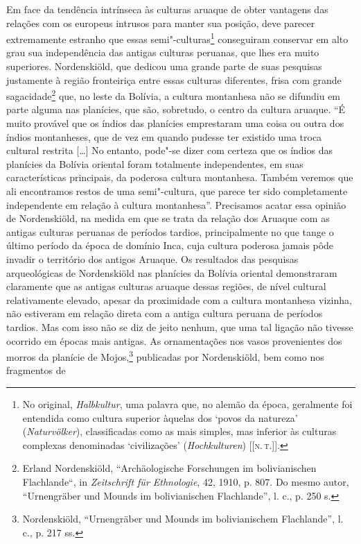 Em face da tendência intrínseca às culturas aruaque de obter vantagens
das relações com os europeus intrusos para manter sua posição, deve
parecer extremamente estranho que essas semi"-culturas\footnote{No original,
  \emph{Halbkultur}, uma palavra que, no alemão da época, geralmente
  foi entendida como cultura superior àquelas dos `povos da natureza'
  (\emph{Naturvölker}), classificadas como as mais simples, mas inferior
  às culturas complexas denominadas `civilizações' (\emph{Hochkulturen})
  {[}{[}\textsc{n.\,t.}{]}{]}.} conseguiram
conservar em alto grau sua independência das antigas culturas peruanas,
que lhes era muito superiores. Nordenskiöld, que dedicou uma grande
parte de suas pesquisas justamente à região fronteiriça entre essas
culturas diferentes, frisa com grande sagacidade\footnote{Erland Nordenskiöld, ``Archäologische Forschungen im bolivianischen
  Flachlande``, in \emph{Zeitschrift für Ethnologie}, 42, 1910, p. 807.
  Do mesmo autor, ``Urnengräber und Mounds im bolivianischen
  Flachlande'', l. c., p. 250 s.} que, no leste da Bolívia, a cultura
montanhesa não se difundiu em parte alguma nas planícies, que são,
sobretudo, o centro da cultura aruaque. ``É muito provável que os índios
das planícies emprestaram uma coisa ou outra dos índios montanheses,
que de vez em quando pudesse ter existido uma troca cultural restrita
{[}\ldots{}{]} No entanto, pode"-se dizer com certeza que os índios das
planícies da Bolívia oriental foram totalmente independentes, em suas
características principais, da poderosa cultura montanhesa. Também
veremos que ali encontramos restos de uma semi"-cultura, que parece ter
sido completamente independente em relação à cultura montanhesa''.
Precisamos acatar essa opinião de Nordenskiöld, na medida em que se
trata da relação dos Aruaque com as antigas culturas peruanas de
períodos tardios, principalmente no que tange o último período da época
de domínio Inca, cuja cultura poderosa jamais pôde invadir o território
dos antigos Aruaque. Os resultados das pesquisas arqueológicas de
Nordenskiöld nas planícies da Bolívia oriental demonstraram claramente
que as antigas culturas aruaque dessas regiões, de nível cultural
relativamente elevado, apesar da proximidade com a cultura montanhesa
vizinha, não estiveram em relação direta com a antiga cultura peruana de
períodos tardios. Mas com isso não se diz de jeito nenhum, que uma tal
ligação não tivesse ocorrido em épocas mais antigas. As ornamentações
nos vasos provenientes dos morros da planície de Mojos,\footnote{Nordenskiöld,
  ``Urnengräber und Mounds im bolivianischem Flachlande'', l. c., p.
  217 ss.} publicadas por Nordenskiöld, bem como nos fragmentos de
